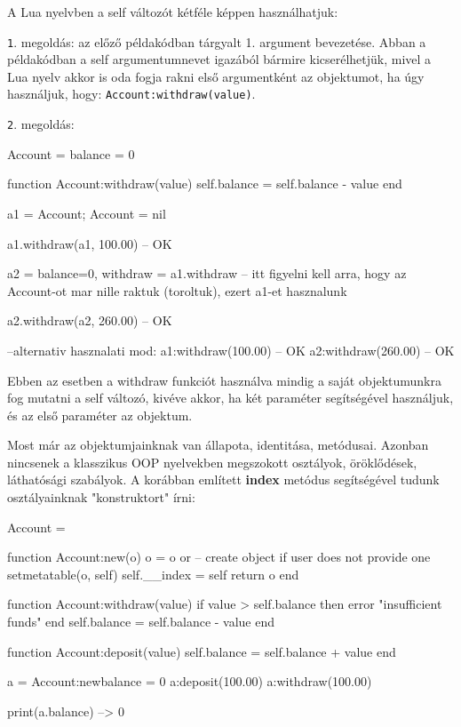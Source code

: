 A Lua nyelvben a self változót kétféle képpen használhatjuk:

\hspace{10mm}\texttt{1}. megoldás: az előző példakódban tárgyalt 1. argument bevezetése. Abban a példakódban a self argumentumnevet igazából bármire kicserélhetjük, mivel a Lua nyelv akkor is oda fogja rakni első argumentként az objektumot, ha úgy használjuk, hogy: \texttt{Account:withdraw(value)}.

\hspace{10mm}\texttt{2}. megoldás:
\begin{lua}
Account = {balance = 0}

function Account:withdraw(value)
  self.balance = self.balance - value
end

a1 = Account; Account = nil

a1.withdraw(a1, 100.00)   -- OK

a2 = {balance=0, withdraw = a1.withdraw} -- itt figyelni kell arra, hogy az Account-ot mar nille raktuk (toroltuk), ezert a1-et hasznalunk 

a2.withdraw(a2, 260.00) -- OK

--alternativ hasznalati mod:
a1:withdraw(100.00) -- OK
a2:withdraw(260.00) -- OK
\end{lua}
Ebben az esetben a withdraw funkciót használva mindig a saját objektumunkra fog mutatni a self változó, kivéve akkor, ha két paraméter segítségével használjuk, és az első paraméter az objektum.

Most már az objektumjainknak van állapota, identitása, metódusai. Azonban nincsenek a klasszikus OOP nyelvekben megszokott osztályok, öröklődések, láthatósági szabályok.\pagebreak
{}
A korábban említett \detokenize{__}\textbf{index} metódus segítségével tudunk osztályainknak "konstruktort" írni:
\begin{lua}
Account = {}

function Account:new(o)
  o = o or {}   -- create object if user does not provide one
  setmetatable(o, self)
  self.__index = self
  return o
end

function Account:withdraw(value)
  if value > self.balance then error "insufficient funds" end
  self.balance = self.balance - value
end

function Account:deposit(value)
  self.balance = self.balance + value
end

a = Account:new{balance = 0}
a:deposit(100.00)
a:withdraw(100.00)

print(a.balance) --> 0
\end{lua}

